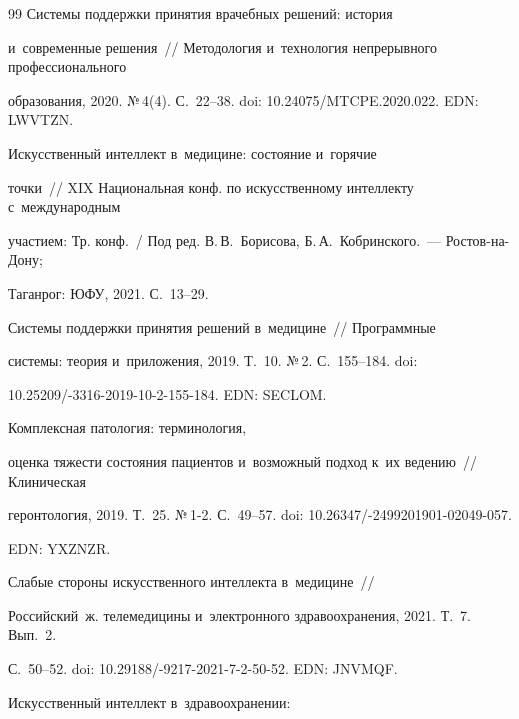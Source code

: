 {{\begin{thebibliography}{99}
 Системы поддержки принятия врачебных решений: история 

и~современные решения~/\!\!/ Методология и~технология непрерывного профессионального 

образования, 2020. №\,4(4). С.~22--38. doi: 10.24075\!/\!MTCPE.2020.022. EDN: LWVTZN.


 Искусственный интеллект в~медицине: состояние и~горячие 

точки~/\!\!/ XIX Национальная конф. по искусственному интеллекту с~международным 

участием: Тр. конф.~/ Под ред. В.\,В.~Борисова, Б.\,А.~Кобринского.~--- Рос\-тов-на-До\-ну; 

Таганрог: ЮФУ, 2021. С.~13--29.








    Системы поддержки принятия решений в~медицине~/\!\!/ Про\-грам\-мные  

сис\-те\-мы: теория и~приложения, 2019. Т.~10. №\,2. С.~155--184. doi:  

10.25209\!/-3316-2019-10-2-155-184. EDN: SECLOM.


    Комплексная патология: терминология, 

оценка тяжести состояния пациентов и~возможный подход к~их ведению~/\!\!/ Клиническая 

геронтология, 2019. Т.~25. №\,1-2. С.~49--57. doi: 10.26347\!/-2499201901-02049-057. 

EDN: YXZNZR.




    Слабые стороны искусственного интеллекта в~медицине~/\!\!/ 

Российский~ж. телемедицины и~электронного здравоохранения, 2021. Т.~7. Вып.~2. 

С.~50--52. doi: 10.29188\!/-9217-2021-7-2-50-52. EDN: JNVMQF.


 Искусственный интеллект в~здравоохранении: 


\end{thebibliography}}}
